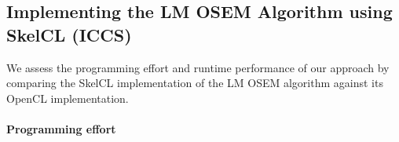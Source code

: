 


\subsection{Implementing the LM OSEM Algorithm using SkelCL (ICCS)}
\label{sec:experiments}
\label{sec:experiments:skelcl}
We assess the programming effort and runtime performance of our approach by comparing the SkelCL implementation of the LM OSEM algorithm against its OpenCL implementation.

\paragraph{Programming effort}

